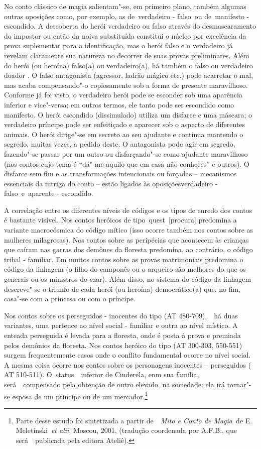 No conto clássico de magia salientam"-se, em primeiro plano, também
algumas outras oposições como, por exemplo, as de~{verdadeiro -
falso}~ou de~{manifesto - escondido}. A descoberta do herói verdadeiro
ou falso através do desmascaramento do impostor ou então da noiva
substituída constitui o núcleo por excelência da prova suplementar para
a identificação, mas o herói falso e o verdadeiro já revelam claramente
sua natureza no decorrer de suas provas preliminares. Além do herói (ou
heroína) falso(a) ou verdadeiro(a), há também o falso ou verdadeiro
doador . O falso antagonista (agressor, ladrão mágico etc.) pode
acarretar o mal, mas acaba compensando"-o copiosamente sob a forma de
presente maravilhoso. Conforme já foi visto, o verdadeiro herói pode se
esconder sob uma aparência inferior e vice"-versa; em outros termos, ele
tanto pode ser escondido como manifesto. O herói escondido (dissimulado)
utiliza um disfarce e uma máscara; o verdadeiro príncipe pode ser
enfeitiçado e aparecer sob o aspecto de diferentes animais. O herói
dirige"-se em secreto ao seu ajudante e continua mantendo o segredo,
muitas vezes, a pedido deste. O antagonista pode agir em segredo,
fazendo"-se passar por um outro ou disfarçando"-se como ajudante
maravilhoso (nos contos cujo tema é ``dá"-me aquilo que em casa não
conheces'' e outros). O disfarce sem fim e as transformações
intencionais ou forçadas -- mecanismos essenciais da intriga do conto --
estão ligados às oposições{verdadeiro - falso}~e~{aparente - escondido}.

A correlação entre os diferentes níveis de códigos e os tipos de enredo
dos contos é bastante visível. Nos contos heróicos de
tipo~{quest}~{[}procura{]} predomina a variante macrocósmica do código
mítico (isso ocorre também nos contos sobre as mulheres milagrosas). Nos
contos sobre as peripécias que acontecem às crianças que caíram nas
garras dos demônes da floresta predomina, ao contrário, o código tribal
- familiar. Em muitos contos sobre as provas matrimoniais predomina o
código da linhagem (o filho do camponês ou o arqueiro são melhores do
que os generais ou os ministros do czar). Além disso, no sistema do
código da linhagem descreve"-se o triunfo de cada herói (ou heroína)
democrático(a) que, no fim, casa"-se com a princesa ou com o príncipe.

Nos contos sobre os perseguidos - inocentes do tipo (AT 480-709),~~há
duas variantes, uma pertence ao nível social - familiar e outra ao nível
místico. A enteada perseguida é levada para a floresta, onde é posta à
prova e premiada pelos demônios da floresta. Nos contos heróico do tipo
(AT 300-303, 550-551) surgem frequentemente casos onde o conflito
fundamental ocorre no nível social. A mesma coisa ocorre nos contos
sobre os personagens inocentes -- perseguidos ( AT 510-511).
O~{status~}~inferior de Cinderela, enm sua família, será~~compensado
pela obtenção de outro elevado, na sociedade: ela irá tornar"-se esposa
de um príncipe ou de um mercador.\footnote{Parte desse estudo foi
  sintetizada a partir de~~\emph{Mito e Conto de Magia}~de E.
  Meletínski~\emph{et alii}, Moscou, 2001, (tradução coordenada por
  A.F.B., que será~~publicada pela editora Ateliê).}

